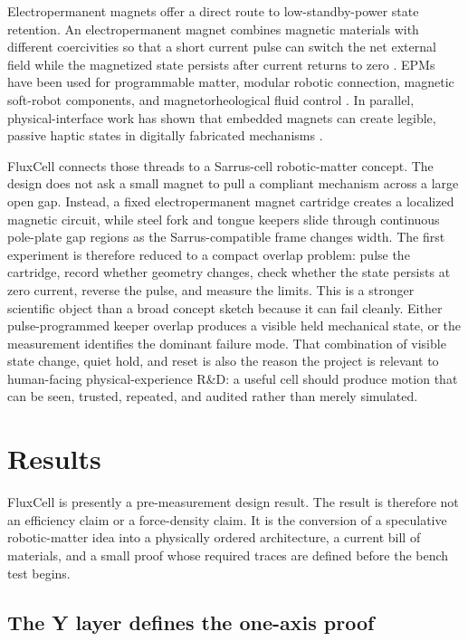 \documentclass[12pt,letterpaper]{article}
\newcommand{\fluxcell}{FluxCell}
\newcommand{\epm}{electropermanent magnet}
\begin{document}
Electropermanent magnets offer a direct route to low-standby-power state retention. An \epm{} combines magnetic materials with different coercivities so that a short current pulse can switch the net external field while the magnetized state persists after current returns to zero \cite{knaian2010,johnson2024,zhu2019}. EPMs have been used for programmable matter, modular robotic connection, magnetic soft-robot components, and magnetorheological fluid control \cite{knaian2010,zhu2019,johnson2024,ntella2023}. In parallel, physical-interface work has shown that embedded magnets can create legible, passive haptic states in digitally fabricated mechanisms \cite{zheng2019}.

\fluxcell{} connects those threads to a Sarrus-cell robotic-matter concept. The design does not ask a small magnet to pull a compliant mechanism across a large open gap. Instead, a fixed \epm{} cartridge creates a localized magnetic circuit, while steel fork and tongue keepers slide through continuous pole-plate gap regions as the Sarrus-compatible frame changes width. The first experiment is therefore reduced to a compact overlap problem: pulse the cartridge, record whether geometry changes, check whether the state persists at zero current, reverse the pulse, and measure the limits. This is a stronger scientific object than a broad concept sketch because it can fail cleanly. Either pulse-programmed keeper overlap produces a visible held mechanical state, or the measurement identifies the dominant failure mode. That combination of visible state change, quiet hold, and reset is also the reason the project is relevant to human-facing physical-experience R\&D: a useful cell should produce motion that can be seen, trusted, repeated, and audited rather than merely simulated.

\section{Results}

\fluxcell{} is presently a pre-measurement design result. The result is therefore not an efficiency claim or a force-density claim. It is the conversion of a speculative robotic-matter idea into a physically ordered architecture, a current bill of materials, and a small proof whose required traces are defined before the bench test begins.

\subsection{The Y layer defines the one-axis proof}
\end{document}
